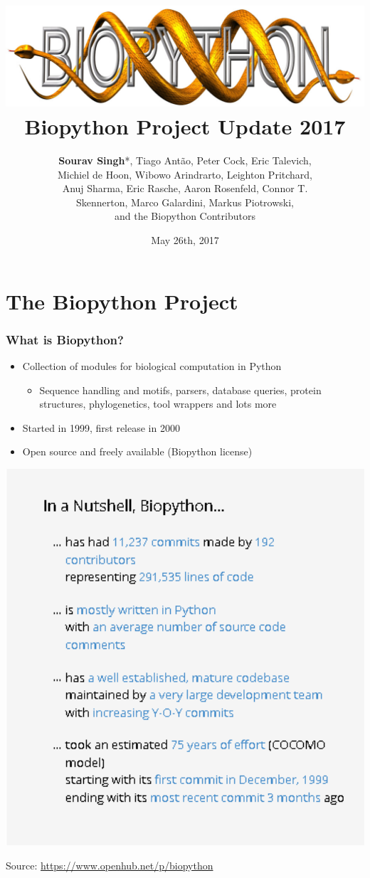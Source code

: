 \documentclass[trans]{beamer}
\title{
  \includegraphics[height=.2\textheight]{../abstract/biopython.jpg}\\[1em]
  Biopython Project Update 2017}
\subtitle{}
\author[Sourav Singh]{
  \textbf{Sourav Singh}*, Tiago Ant\~{a}o, Peter Cock, Eric Talevich,\\
  Michiel de Hoon, Wibowo Arindrarto, Leighton Pritchard,\\
  Anuj Sharma, Eric Rasche, Aaron Rosenfeld, Connor T.\\
  Skennerton, Marco Galardini, Markus Piotrowski,\\
  and the Biopython Contributors}
\institute[University of Pune]{
  Bioinformatics Open Source Conference 2017, Prague, CZ \\[1em]
}
\date{May 26th, 2017}
\begin{document}
\section{The Biopython Project}
\frame
{
  \frametitle{What is Biopython?}

  \begin{itemize}
  \item Collection of modules for biological computation in Python
  \begin{itemize}
  \item Sequence handling and motifs, parsers, database queries, protein structures, phylogenetics, tool wrappers and lots more
  \end{itemize}
  \item Started in 1999, first release in 2000
  \item Open source and freely available (Biopython license)
  \end{itemize}

  \begin{center}
  \includegraphics[width=1\textwidth]{figures/openhub-bp-nutshell.png}
  \end{center}
  \small{Source: \url{https://www.openhub.net/p/biopython}}
}
\frame
\end{document}
